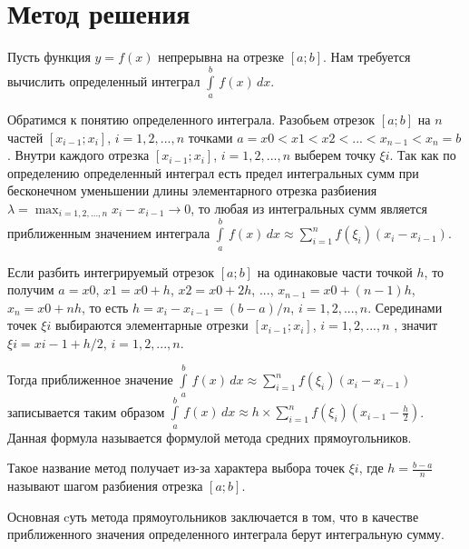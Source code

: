 \documentclass{report}
\begin{document}
\section*{Метод решения}
Пусть функция $y = f(x)$ непрерывна на отрезке $[a; b]$. Нам требуется вычислить определенный
интеграл $\int\limits_a^b\,f(x)\,dx$.
\par Обратимся к понятию определенного интеграла. Разобьем отрезок $[a; b]$ на $n$ частей $[x_{i-1}; x_{i}]$, $i = 1, 2, ..., n$ точками $a = x0 < x1 < x2 < ... < x_{n-1} < x_{n} = b$. Внутри каждого отрезка $[x_{i-1}; x_{i}]$, $i =1, 2,...,n$ выберем точку $\xi{i}$. Так как по определению определенный интеграл есть предел интегральных сумм при бесконечном уменьшении длины элементарного отрезка разбиения $\lambda = \max_{i = 1,2,...,n} x_{i} - x_{i-1} \rightarrow 0$, то любая из интегральных сумм является приближенным значением интеграла $\int\limits_a^b\,f(x)\,dx\approx\sum_{i=1}^n f(\xi_{i})(x_{i}-x_{i-1})$.
\par Если разбить интегрируемый отрезок $[a; b]$ на одинаковые части точкой $h$, то получим $a = x0$, $x1=x0+h$, $x2=x0+2h$, $...$, $x_{n-1}=x0+(n-1)h$, $x_{n}=x0+nh$, то есть $h = x_{i}- x_{i-1} = (b-a)/n$, $i=1, 2, ..., n$. Серединами точек $\xi{i}$ выбираются элементарные отрезки $[x_{i-1}; x_{i}]$, $i = 1, 2, ..., n$ , значит $\xi{i}=xi-1 + h/2$, $i=1, 2, ..., n$.
\par Тогда приближенное значение $\int\limits_a^b\,f(x)\,dx\approx\sum_{i=1}^n f(\xi_{i}) (x_{i}-x_{i-1})$ записывается таким образом  $\int\limits_a^b\,f(x)\,dx\approx h \times \sum_{i=1}^n f(\xi_{i}) (x_{i-1} - \frac{h}{2})$. Данная формула называется формулой метода средних прямоугольников.
\par Такое название метод получает из-за характера выбора точек $\xi{i}$, где $h=\frac{b-a}{n}$ называют шагом разбиения отрезка $[a; b]$.
\par Основная cуть метода прямоугольников заключается в том, что в качестве приближенного значения определенного интеграла берут интегральную сумму.
\newpage
\end{document}

